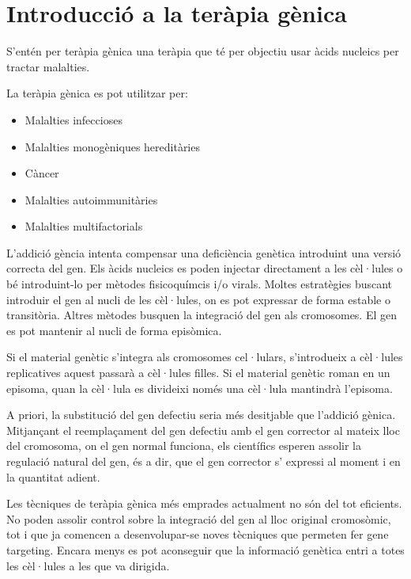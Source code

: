 \section{Introducció a la teràpia gènica}
\label{sec:intr-la-terap}

S'entén per teràpia gènica una teràpia que té per objectiu usar àcids nucleics per tractar malalties.

La teràpia gènica es pot utilitzar per:
\begin{itemize}
\item Malalties infeccioses
\item Malalties monogèniques hereditàries
\item Càncer
\item Malalties autoimmunitàries
\item Malalties multifactorials
\end{itemize}

L'addició gència intenta compensar una deficiència genètica introduint una versió correcta del gen. Els àcids nucleics es poden injectar directament a les cèl·lules o bé introduint-lo per mètodes fisicoquímcis i/o virals. Moltes estratègies buscant introduir el gen al nucli de les cèl·lules, on es pot expressar de forma estable o transitòria. Altres mètodes busquen la integració del gen als cromosomes. El gen es pot mantenir al nucli de forma episòmica.

Si el material genètic s'integra als cromosomes cel·lulars, s'introdueix a cèl·lules replicatives aquest passarà a cèl·lules filles. Si el material genètic roman en un episoma, quan la cèl·lula es divideixi només una cèl·lula mantindrà l'episoma.

A priori, la substitució del gen defectiu seria més desitjable que l'addició gènica. Mitjançant el reemplaçament del gen defectiu amb el gen corrector al mateix lloc del cromosoma, on el gen normal funciona, els científics esperen assolir la regulació natural del gen, és a dir, que el gen corrector s' expressi al moment i en la quantitat adient.

Les tècniques de teràpia gènica més emprades actualment no són del tot eficients. No poden assolir control sobre la integració del gen al lloc original cromosòmic, tot i que ja comencen a desenvolupar-se noves tècniques que permeten fer gene targeting. Encara menys es pot aconseguir que la informació genètica entri a totes les cèl·lules a les que va dirigida.

